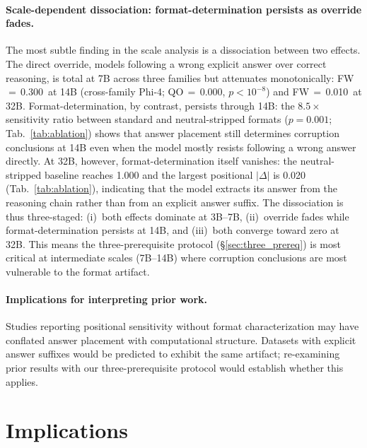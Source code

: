\documentclass{article}
\theoremstyle{definition}
\theoremstyle{definition}
\newcommand{\PHIFOURCCFW}{0.300}
\newcommand{\PHIFOURQOACC}{0.000}
\newcommand{\PHIFOURCCPVAL}{$p{<}10^{-8}$}
\newcommand{\QWTBCCFW}{0.010}
\begin{document}
\paragraph{Scale-dependent dissociation: format-determination persists as override fades.}
The most subtle finding in the scale analysis is a dissociation between two
effects. The direct override, models following a wrong explicit answer over
correct reasoning, is total at 7B across three families but attenuates
monotonically: FW\,$=$\,\PHIFOURCCFW\ at 14B (cross-family Phi-4;
QO\,$=$\,\PHIFOURQOACC, \PHIFOURCCPVAL) and FW\,$=$\,\QWTBCCFW\ at 32B.
Format-determination, by contrast, persists through 14B: the
$8.5\times$ sensitivity ratio between standard and neutral-stripped formats
($p{=}0.001$; Tab.~\ref{tab:ablation}) shows that answer placement still
determines corruption conclusions at 14B even when the model mostly resists
following a wrong answer directly. At 32B, however, format-determination
itself vanishes: the neutral-stripped baseline reaches 1.000 and the largest
positional $|\Delta|$ is 0.020 (Tab.~\ref{tab:ablation}), indicating that
the model extracts its answer from the reasoning chain rather than from
an explicit answer suffix. The dissociation is thus three-staged: (i)~both
effects dominate at 3B--7B, (ii)~override fades while format-determination
persists at 14B, and (iii)~both converge toward zero at 32B. This means the
three-prerequisite protocol (\S\ref{sec:three_prereq}) is most critical at
intermediate scales (7B--14B) where corruption conclusions are most vulnerable
to the format artifact.

\paragraph{Implications for interpreting prior work.}
Studies reporting positional sensitivity without format characterization
may have conflated answer placement with computational structure.
Datasets with explicit answer suffixes would be predicted to exhibit the
same artifact; re-examining prior results with our three-prerequisite
protocol would establish whether this applies.

\section{Implications}
\label{sec:implications}
\end{document}
